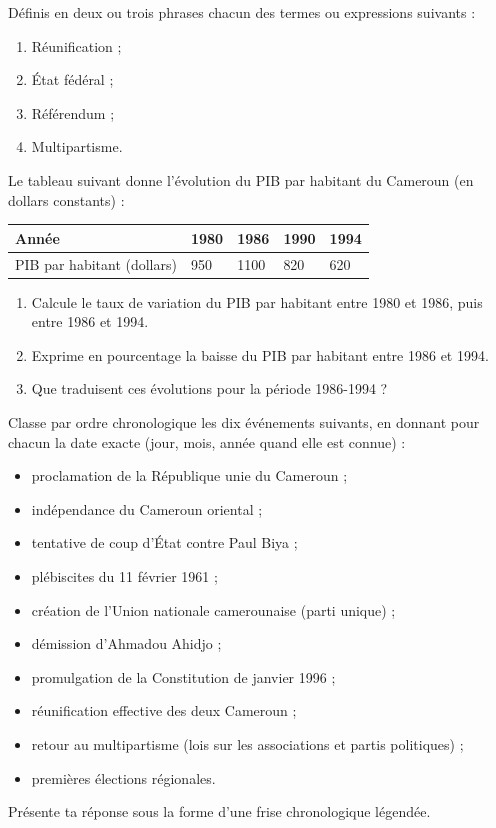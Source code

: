 \documentclass[11pt]{article}
\newcounter{popsec}
\newcounter{popsub}
\newcommand{\courssub}[1]{%
  \stepcounter{popsub}%
  \par\vspace{9pt}\noindent{\popxbold\fontsize{11.5}{13}\selectfont\color{popink}{\color{poporange}\thepopsec.\thepopsub}\hspace{6pt}#1}\par\nopagebreak\vspace{4pt}
}
\begin{document}
\begin{exercice}[Définitions]
Définis en deux ou trois phrases chacun des termes ou expressions suivants :
\begin{enumerate}
\item Réunification ;
\item État fédéral ;
\item Référendum ;
\item Multipartisme.
\end{enumerate}
\end{exercice}

\begin{exercice}
Le tableau suivant donne l'évolution du PIB par habitant du Cameroun (en dollars constants) :

\begin{center}
\begin{tabularx}{\linewidth}{|l|X|X|X|X|}\hline
\rowcolor{popblueL} Année & 1980 & 1986 & 1990 & 1994 \\ \hline
PIB par habitant (dollars) & 950 & 1100 & 820 & 620 \\ \hline
\end{tabularx}
\end{center}

\begin{enumerate}
\item Calcule le taux de variation du PIB par habitant entre 1980 et 1986, puis entre 1986 et 1994.
\item Exprime en pourcentage la baisse du PIB par habitant entre 1986 et 1994.
\item Que traduisent ces évolutions pour la période 1986-1994 ?
\end{enumerate}
\end{exercice}

\courssub{Je m'entraîne}

\begin{exercice}
Classe par ordre chronologique les dix événements suivants, en donnant pour chacun la date exacte (jour, mois, année quand elle est connue) :
\begin{itemize}
\item proclamation de la République unie du Cameroun ;
\item indépendance du Cameroun oriental ;
\item tentative de coup d'État contre Paul Biya ;
\item plébiscites du 11 février 1961 ;
\item création de l'Union nationale camerounaise (parti unique) ;
\item démission d'Ahmadou Ahidjo ;
\item promulgation de la Constitution de janvier 1996 ;
\item réunification effective des deux Cameroun ;
\item retour au multipartisme (lois sur les associations et partis politiques) ;
\item premières élections régionales.
\end{itemize}
Présente ta réponse sous la forme d'une frise chronologique légendée.
\end{exercice}
\end{document}
